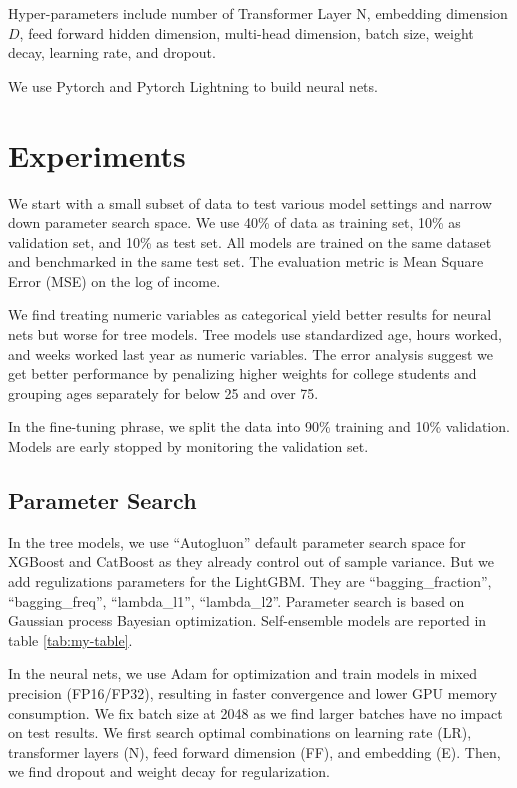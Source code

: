 \documentclass[11pt, letter,twocolumn]{article}
\begin{document}
Hyper-parameters include number of Transformer Layer N, embedding dimension $ D $,  feed forward hidden dimension, multi-head dimension, batch size,  weight decay, learning rate, and dropout. 

We use Pytorch \parencite{paszke_pytorch:_2019} and Pytorch Lightning \parencite{falcon2019pytorch} to build neural nets.


\section{Experiments}

We start with a small subset of data to test various model settings and narrow down parameter search space. We use  40\% of  data as training set, 10\% as validation set, and 10\% as test set. All models are trained on the same dataset and benchmarked in the same test set. The evaluation metric is  Mean Square Error (MSE) on the log of income.

We find treating numeric variables as categorical yield better results for neural nets but worse for tree models. Tree models use standardized age, hours worked, and weeks worked last year as numeric variables. 
The error analysis suggest we get better performance by  penalizing higher weights for college students and grouping ages separately for below 25 and over 75.   




In the fine-tuning phrase, we split the data into 90\% training and 10\% validation. Models are early stopped by monitoring the validation set.


\subsection{Parameter Search}
In the tree models, we use  ``Autogluon'' default parameter search space for XGBoost and CatBoost as they already control out of sample variance. But we add regulizations  parameters  for the LightGBM. They are ``bagging\_fraction'', ``bagging\_freq'', ``lambda\_l1'', ``lambda\_l2''.  Parameter search is based on Gaussian process Bayesian optimization. Self-ensemble models are reported in table \ref{tab:my-table}.



In the neural nets, we use Adam for optimization and train models in mixed precision (FP16/FP32), resulting in faster convergence and lower GPU memory consumption. We fix batch size at 2048 as we find larger batches have no impact on test results.  We first search optimal combinations on learning rate (LR), transformer layers (N), feed forward dimension (FF), and embedding (E). Then, we find dropout and weight decay for regularization. 
\end{document}

